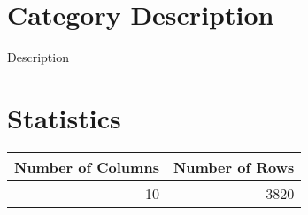 \documentclass[
  letterpaper,
  DIV=11,
  numbers=noendperiod]{scrreprt}
\begin{document}
\hypertarget{category-description-53}{%
\section*{Category Description}\label{category-description-53}}

Description

\hypertarget{statistics-53}{%
\section*{Statistics}\label{statistics-53}}

\begin{longtable}{rr}
\toprule
Number of Columns & Number of Rows \\ 
\midrule
10 & 3820 \\ 
\bottomrule
\end{longtable}
\end{document}
